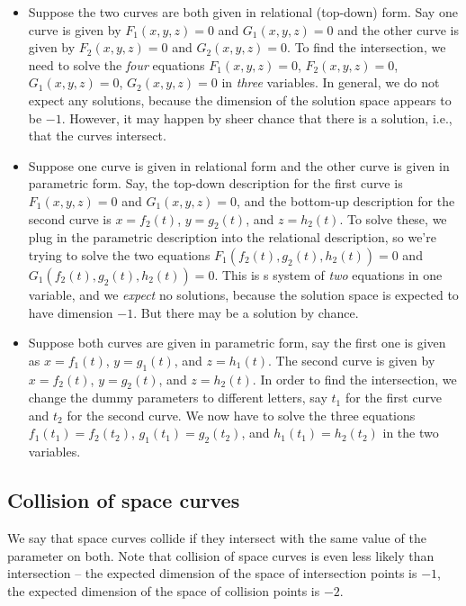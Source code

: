 \documentclass[10pt]{amsart}
\begin{document}
\begin{itemize}
\item Suppose the two curves are both given in relational (top-down)
  form. Say one curve is given by $F_1(x,y,z) = 0$ and $G_1(x,y,z) =
  0$ and the other curve is given by $F_2(x,y,z) = 0$ and $G_2(x,y,z)
  = 0$. To find the intersection, we need to solve the {\em four}
  equations $F_1(x,y,z) = 0$, $F_2(x,y,z) = 0$, $G_1(x,y,z) = 0$,
  $G_2(x,y,z) = 0$ in {\em three} variables. In general, we do not
  expect any solutions, because the dimension of the solution space
  appears to be $-1$. However, it may happen by sheer chance that
  there is a solution, i.e., that the curves intersect.
\item Suppose one curve is given in relational form and the other
  curve is given in parametric form. Say, the top-down description for
  the first curve is $F_1(x,y,z) = 0$ and $G_1(x,y,z) = 0$, and the
  bottom-up description for the second curve is $x = f_2(t)$, $y =
  g_2(t)$, and $z = h_2(t)$. To solve these, we plug in the parametric
  description into the relational description, so we're trying to
  solve the two equations $F_1(f_2(t),g_2(t),h_2(t)) = 0$ and
  $G_1(f_2(t),g_2(t),h_2(t)) = 0$. This is s system of {\em two}
  equations in one variable, and we {\em expect} no solutions, because
  the solution space is expected to have dimension $-1$. But there may
  be a solution by chance.
\item Suppose both curves are given in parametric form, say the first
  one is given as $x = f_1(t)$, $y = g_1(t)$, and $z = h_1(t)$. The
  second curve is given by $x = f_2(t)$, $y = g_2(t)$, and $z =
  h_2(t)$. In order to find the intersection, we change the dummy
  parameters to different letters, say $t_1$ for the first curve and
  $t_2$ for the second curve. We now have to solve the three equations
  $f_1(t_1) = f_2(t_2)$, $g_1(t_1) = g_2(t_2)$, and $h_1(t_1) =
  h_2(t_2)$ in the two variables.
\end{itemize}

\subsection{Collision of space curves}

We say that space curves collide if they intersect with the same value
of the parameter on both. Note that collision of space curves is even
less likely than intersection -- the expected dimension of the space
of intersection points is $-1$, the expected dimension of the space of
collision points is $-2$.
\end{document}
